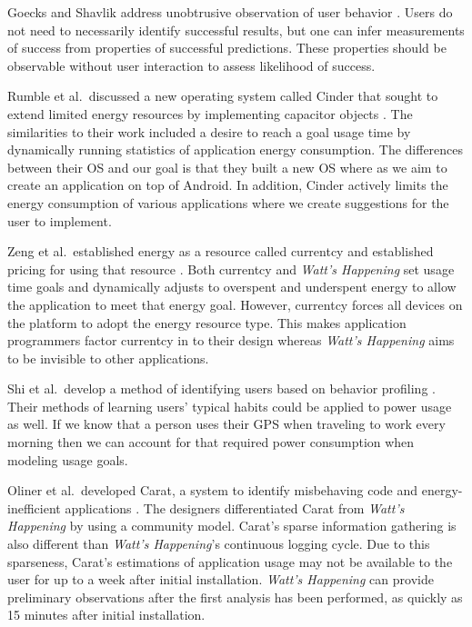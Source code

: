 Goecks and Shavlik address unobtrusive observation of user behavior \cite{Goecks:2000:LUI:325737.325806}. 
Users do not need to necessarily identify successful results, but one can infer measurements of success from properties of successful predictions. 
These properties should be observable without user interaction to assess likelihood of success. 

Rumble et al.\ discussed a new operating system called Cinder that sought to extend limited energy resources by implementing capacitor objects \cite{Rumble:2009:AJT:1592606.1592618}. 
The similarities to their work included a desire to reach a goal usage time by dynamically running statistics of application energy consumption. 
The differences between their OS and our goal is that they built a new OS where as we aim to create an application on top of Android. 
In addition, Cinder actively limits the energy consumption of various applications where we create suggestions for the user to implement. 

Zeng et al.\ established energy as a resource called currentcy and established pricing for using that resource \cite{Zeng:2003:CUA:1247340.1247344}. 
Both currentcy and\emph{ Watt's Happening} set usage time goals and dynamically adjusts to overspent and underspent energy to allow the application to meet that energy goal. 
However, currentcy forces all devices on the platform to adopt the energy resource type. 
This makes application programmers factor currentcy in to their design whereas \emph{Watt's Happening} aims to be invisible to other applications. 

Shi et al.\ develop a method of identifying users based on behavior profiling \cite{learningUserBehavior}. 
Their methods of learning users' typical habits could be applied to power usage as well. 
If we know that a person uses their GPS when traveling to work every morning then we can account for that required power consumption when modeling usage goals. 

Oliner et al.\ developed Carat, a system to identify misbehaving code and energy-inefficient applications \cite{Oliner:2012:CED:2387858.2387864}.
The designers differentiated Carat from \emph{Watt's Happening} by using a community model.
Carat's sparse information gathering is also different than \emph{Watt's Happening}'s continuous logging cycle.
Due to this sparseness, Carat's estimations of application usage may not be available to the user for up to a week after initial installation.
\emph{Watt's Happening} can provide preliminary observations after the first analysis has been performed, as quickly as 15 minutes after initial installation.

%
% 	
% 
